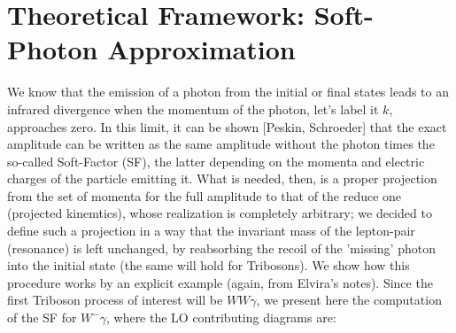 \documentclass{report}
\begin{document}
\section{Theoretical Framework: Soft-Photon Approximation}
We know that the emission of a photon from the initial or final states leads to an infrared divergence when the momentum of the photon, let's label it $k$, approaches zero. In this limit, it can be shown [Peskin, Schroeder] that the exact amplitude can be written as the same amplitude without the photon times the so-called Soft-Factor (SF), the latter depending on the momenta
and electric charges of the particle emitting it. What is needed, then, is a proper projection from the set of momenta for the full amplitude to that of the reduce one (projected kinemtics), whose realization is completely arbitrary; we decided to define such a projection in a way that the invariant mass of the lepton-pair (resonance) is left unchanged, by reabsorbing the recoil 
of the 'missing' photon into the initial state (the same will hold for Tribosons).
We show how this procedure works by an explicit example (again, from Elvira's notes). 
\newpage Since the first Triboson process of interest will be $WW\gamma$, we present here the computation of the SF for $W^-\gamma$, where the LO contributing diagrams are:
\end{document}

